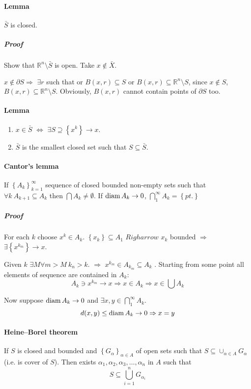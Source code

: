 \paragraph{Lemma} $\bar{S}$ is closed.
\subparagraph{Proof} Show that $\mathbb{R}^n \setminus \bar{S}$ is open. Take $x \notin \bar{X}$.

$x \notin \partial S \Rightarrow$  $\exists r$ such that or $B(x,r) \subseteq S$ or $B(x,r) \subseteq \mathbb{R}^n \setminus  S$, since $x\notin S$, $B(x,r) \subseteq \mathbb{R}^n \setminus  S$. Obviously, $B(x,r)$ cannot contain points of $\partial S$ too.
\paragraph{Lemma}
\begin{enumerate}
	\item $x \in \bar{S}$ $\iff$ $\exists S \supseteq \left\{ x^k\right\} \to x$.
	\item $\bar{S}$ is the smallest closed set such that $S \subseteq \bar{S}$.
	
\end{enumerate}

\paragraph{Cantor's lemma}
If $\left\{ A_k \right\}_{k=1}^{\infty}$ sequence of closed bounded non-empty sets such that $\forall k \: A_{k+1}\subseteq A_k$ then $\bigcap A_k \neq \emptyset$. If $\operatorname{diam} A_k \to 0$, $\bigcap_1^\infty A_k = \left\{ pt. \right\}$
\subparagraph{Proof}
For each $k$ choose $x^k \in A_k$. $\left\{x_k \right\} \subseteq A_1$ $Righarrow$ $x_k$ bounded $\Rightarrow$ $\exists \left\{x^{k_m}\right\} \to x$. 

Given $k$ $\exists M \forall m > M \: k_n > k$. $\Rightarrow$ $x^{k_m} \in A_{k_m} \subseteq A_k$ . Starting from some point all elements of sequence are contained in $A_k$:
$$A_k \ni x^{k_m} \to x \Rightarrow x \in A_k \Rightarrow x\in \bigcup A_k$$

Now suppose $\operatorname{diam} A_k \to 0$ and $\exists x,y \in \bigcap_1^\infty A_k $.
$$d(x,y) \leq \operatorname{diam} A_k \to 0 \Rightarrow x=y$$
\paragraph{Heine–Borel theorem}
If $S$ is closed and bounded and $\left\{ G_\alpha  \right\}_{\alpha \in A}$ of open sets such that $S \subseteq \cup_{\alpha \in A} G_\alpha$ (i.e. is cover of  $S$). Then exists $\alpha_1, \alpha_2,\alpha_3,\dots,\alpha_n$ in $A$ such that
$$S \subseteq \bigcup_{i=1}^n  G_{\alpha_i}$$
